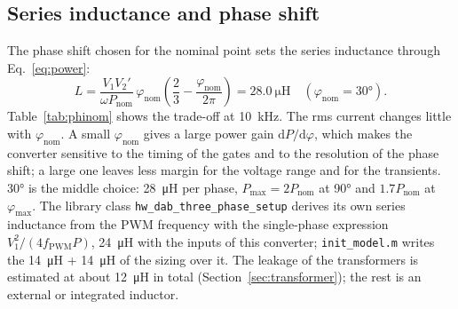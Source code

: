 \documentclass[12pt,a4paper]{scrartcl}
\newcommand{\ped}[1]{_{\mathrm{#1}}}
\newcommand{\code}[1]{\texttt{#1}}
\begin{document}
\begin{onehalfspace}
\subsection{Series inductance and phase shift}
\label{sec:inductance}

The phase shift chosen for the nominal point sets the series inductance through Eq.~\eqref{eq:power}:
\begin{equation}
	L = \frac{V\ped{1} V\ped{2}'}{\omega P\ped{nom}}\,\varphi\ped{nom}\left(\frac{2}{3} - \frac{\varphi\ped{nom}}{2\pi}\right) = \SI{28.0}{\micro\henry} \quad (\varphi\ped{nom} = \ang{30}).
	\label{eq:L}
\end{equation}
Table~\ref{tab:phinom} shows the trade-off at \SI{10}{\kilo\hertz}. The rms current changes little with $\varphi\ped{nom}$. A small $\varphi\ped{nom}$ gives a large power gain $\mathrm{d}P/\mathrm{d}\varphi$, which makes the converter sensitive to the timing of the gates and to the resolution of the phase shift; a large one leaves less margin for the voltage range and for the transients. \ang{30} is the middle choice: \SI{28}{\micro\henry} per phase, $P\ped{max} = 2 P\ped{nom}$ at \ang{90} and $1.7 P\ped{nom}$ at $\varphi\ped{max}$. The library class \code{hw\_dab\_three\_phase\_setup} derives its own series inductance from the PWM frequency with the single-phase expression $V\ped{1}^2/(4 f\ped{PWM} P)$, \SI{24}{\micro\henry} with the inputs of this converter; \code{init\_model.m} writes the \SI{14}{\micro\henry} + \SI{14}{\micro\henry} of the sizing over it. The leakage of the transformers is estimated at about \SI{12}{\micro\henry} in total (Section~\ref{sec:transformer}); the rest is an external or integrated inductor.


\end{onehalfspace}
\end{document}
